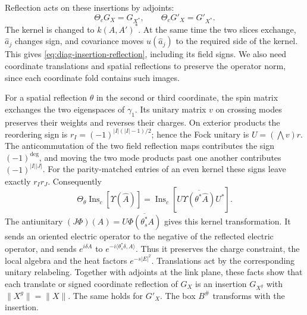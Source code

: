 \documentclass[11pt,letterpaper,reqno]{amsart}
\begin{document}
Reflection acts on these insertions by adjoints:
\begin{equation}\label{eq:diag-insertion-reflection}
 \Theta_cG_X=G_{X^*},\qquad\Theta_cG'_X=G'_{X^*}.
\end{equation}
The kernel is changed to $k(A,A')^*$. At the same time the two
slices exchange, $\widehat a_j$ changes sign, and covariance moves
$u(\widehat a_j)$ to the required side of the kernel. This gives
\eqref{eq:diag-insertion-reflection}, including its field signs.
We also need coordinate translations and spatial reflections to
preserve the operator norm, since each coordinate fold contains
such images.

For a spatial reflection $\theta$ in the second or third coordinate,
the spin matrix exchanges the two eigenspaces of $\gamma_1$.
Its unitary matrix $v$ on crossing modes preserves their weights
and reverses their charges. On exterior products the reordering
sign is $r_I=(-1)^{|I|(|I|-1)/2}$; hence the Fock unitary is
$U=(\bigwedge v)r$. The anticommutation of the two field reflection
maps contributes the sign $(-1)^{\deg}$, and moving the two mode
products past one another contributes $(-1)^{|I||J|}$. For the
parity-matched entries of an even kernel these signs leave exactly
$r_Ir_J$. Consequently
\[
 \Theta_\theta\operatorname{Ins}_c[\Upsilon(\widehat A)]
 =\operatorname{Ins}_c[
       U\overline{\Upsilon(\theta^*\widehat A)}U^*].
\]
The antiunitary
$(J\Phi)(A)=U\overline{\Phi(\theta_s^*A)}$ gives this kernel
transformation. It sends an oriented electric operator to the
negative of the reflected electric operator, and sends
$e^{i\delta A}$ to $e^{-i\langle\theta_s^*\delta,A\rangle}$.
Thus it preserves the charge constraint, the local algebra and
the heat factors $e^{-s|E|^2}$. Translations act by the corresponding
unitary relabeling. Together with adjoints at the link plane, these
facts show that each translate or signed coordinate reflection
of $G_X$ is an insertion $G_{X^g}$ with
$\|X^g\|=\|X\|$. The same holds for $G'_X$. The box $B^\#$
transforms with the insertion.
\end{document}
